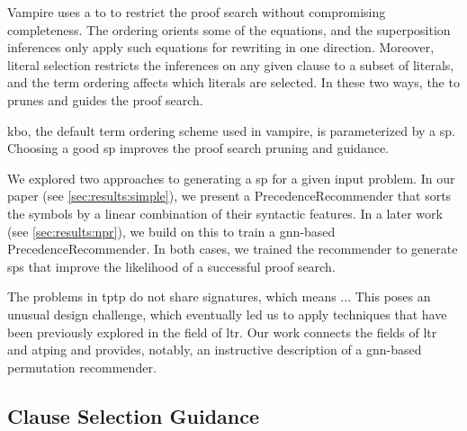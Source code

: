 Vampire uses a \gls{to} to restrict the proof search without compromising completeness.
The ordering orients some of the equations, and the superposition inferences only apply such equations for rewriting in one direction.
Moreover, literal selection restricts the inferences on any given clause to a subset of literals, and the term ordering affects which literals are selected.
In these two ways, the \gls{to} prunes and guides the proof search.

\Gls{kbo}, the default term ordering scheme used in \gls{vampire}, is parameterized by a \gls{sp}.
Choosing a good \gls{sp} improves the proof search pruning and guidance.

We explored two approaches to generating a \gls{sp} for a given input problem.
In our paper \cite{} (see \cref{sec:results:simple}), we present a \gls{PrecedenceRecommender} that sorts the symbols by a linear combination of their syntactic features.
In a later work (see \cref{sec:results:npr}), we build on this to train a \acrshort{gnn}-based \gls{PrecedenceRecommender}.
In both cases, we trained the recommender to generate \glspl{sp} that improve the likelihood of a successful proof search.


The problems in \gls{tptp} do not share signatures,
which means ...\todo{}
This poses an unusual design challenge,
which eventually led us to apply techniques that have been previously explored in the field of \gls{ltr}.
Our work connects the fields of \gls{ltr} and \gls{atping} and provides, notably, an instructive description of a \acrshort{gnn}-based permutation recommender.

\subsection{Clause Selection Guidance}
\label{sec:contrib:ClauseSelection}


